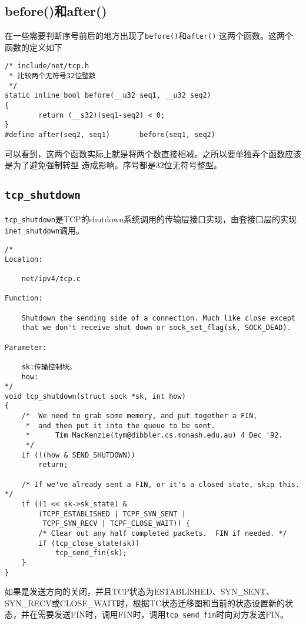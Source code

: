 \subsection{before()和after()}
在一些需要判断序号前后的地方出现了\texttt{before()}和\texttt{after()}
这两个函数。这两个函数的定义如下
\begin{verbatim}
/* include/net/tcp.h
 * 比较两个无符号32位整数
 */
static inline bool before(__u32 seq1, __u32 seq2)
{
        return (__s32)(seq1-seq2) < 0;
}
#define after(seq2, seq1)       before(seq1, seq2)
\end{verbatim}
可以看到，这两个函数实际上就是将两个数直接相减。之所以要单独弄个函数应该是为了避免强制转型
造成影响。序号都是32位无符号整型。

    \subsection{\texttt{tcp_shutdown}}

        \texttt{tcp_shutdown}是TCP的shutdown系统调用的传输层接口实现，由套接口层的实现\texttt{inet_shutdown}调用。
\begin{verbatim}
/*
Location:

    net/ipv4/tcp.c

Function:
    
    Shutdown the sending side of a connection. Much like close except
    that we don't receive shut down or sock_set_flag(sk, SOCK_DEAD).

Parameter:

    sk:传输控制块。
    how:
*/
void tcp_shutdown(struct sock *sk, int how)
{
    /*  We need to grab some memory, and put together a FIN,
     *  and then put it into the queue to be sent.
     *      Tim MacKenzie(tym@dibbler.cs.monash.edu.au) 4 Dec '92.
     */
    if (!(how & SEND_SHUTDOWN))
        return;

    /* If we've already sent a FIN, or it's a closed state, skip this. */
    if ((1 << sk->sk_state) &
        (TCPF_ESTABLISHED | TCPF_SYN_SENT |
         TCPF_SYN_RECV | TCPF_CLOSE_WAIT)) {
        /* Clear out any half completed packets.  FIN if needed. */
        if (tcp_close_state(sk))
            tcp_send_fin(sk);
    }
}
\end{verbatim}
        如果是发送方向的关闭，并且TCP状态为ESTABLISHED、SYN\_SENT、SYN\_RECV或CLOSE\_WAIT时，根据TC状态迁移图和当前的状态设置新的状态，并在需要发送FIN时，调用FIN时，调用\texttt{tcp_send_fin}时向对方发送FIN。

